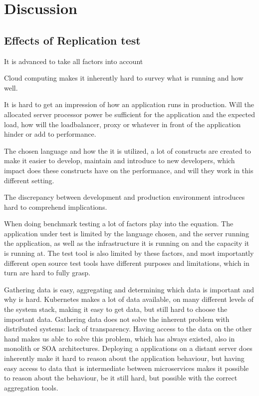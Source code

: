 \chapter{Discussion}
\label{ch:discussion}


\section{Effects of Replication test}
It is advanced to take all factors into account

Cloud computing makes it inherently hard to survey what is running and how well.

It is hard to get an impression of how an application runs in production. Will the allocated server processor power be sufficient for the application and the expected load, how will the loadbalancer, proxy or whatever in front of the application hinder or add to performance.

The chosen language and how the it is utilized, a lot of constructs are created to make it easier to develop, maintain and introduce to new developers, which impact does these constructs have on the performance, and will they work in this different setting.

The discrepancy between development and production environment introduces hard to comprehend implications.

When doing benchmark testing a lot of factors play into the equation. The application under test is limited by the language chosen, and the server running the application, as well as the infrastructure it is running on and the capacity it is running at. The test tool is also limited by these factors, and most importantly different open source test tools have different purposes and limitations, which in turn are hard to fully grasp.

Gathering data is easy, aggregating and determining which data is important and why is hard. Kubernetes makes a lot of data available, on many different levels of the system stack, making it easy to get data, but still hard to choose the important data. Gathering data does not solve the inherent problem with distributed systems: lack of transparency. Having access to the data on the other hand makes us able to solve this problem, which has always existed, also in monolith or SOA architectures. Deploying a applications on a distant server does inherently make it hard to reason about the application behaviour, but having easy access to data that is intermediate between microservices makes it possible to reason about the behaviour, be it still hard, but possible with the correct aggregation tools.

